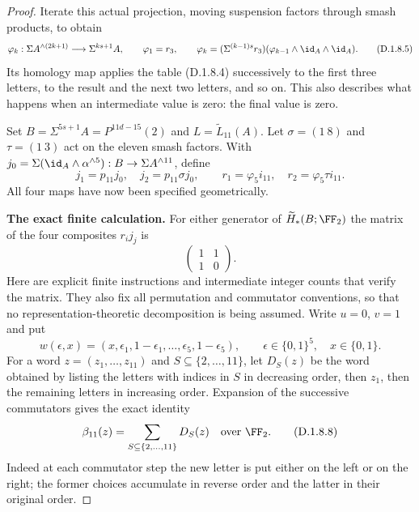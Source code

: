 \begin{proof}
Iterate this actual projection, moving suspension factors through
smash products, to obtain
\[
 \varphi_k:\Sigma A^{\wedge(2k+1)}
                     \longrightarrow\Sigma^{ks+1}A,
 \qquad
 \varphi_1=r_3,\qquad
 \varphi_k=(\Sigma^{(k-1)s}r_3)
                (\varphi_{k-1}\wedge\id_A\wedge\id_A).
 \tag{D.1.8.5}
\]
Its homology map applies the table (D.1.8.4) successively to the
first three letters, to the result and the next two letters, and
so on. This also describes what happens when an intermediate
value is zero: the final value is zero.

Set $B=\Sigma^{5s+1}A=P^{11d-15}(2)$ and
$L=\widetilde L_{11}(A)$. Let $\sigma=(1\ 8)$ and
$\tau=(1\ 3)$ act on the eleven smash factors. With
$j_0=\Sigma(\id_A\wedge\alpha^{\wedge5}):
B\to\Sigma A^{\wedge11}$, define
\[
 j_1=p_{11}j_0,\quad j_2=p_{11}\sigma j_0,
 \qquad
 r_1=\varphi_5i_{11},\quad r_2=\varphi_5\tau i_{11}.
 \tag{D.1.8.6}
\]
All four maps have now been specified geometrically.

\medskip\noindent
\textbf{The exact finite calculation.}
For either generator of $\widetilde H_*(B;\FF_2)$ the matrix
of the four composites $r_i j_j$ is
\[
                     \begin{pmatrix}1&1\\1&0\end{pmatrix}.
 \tag{D.1.8.7}
\]
Here are explicit finite instructions and intermediate integer
counts that verify the matrix. They also fix all permutation and
commutator conventions, so that no representation-theoretic
decomposition is being assumed. Write $u=0$, $v=1$ and put
\[
 w(\epsilon,x)=
 (x,\epsilon_1,1-\epsilon_1,\ldots,
       \epsilon_5,1-\epsilon_5),
 \qquad\epsilon\in\{0,1\}^5,\quad x\in\{0,1\}.
\]
For a word $z=(z_1,\ldots,z_{11})$ and
$S\subseteq\{2,\ldots,11\}$, let $D_S(z)$ be the word obtained
by listing the letters with indices in $S$ in decreasing order,
then $z_1$, then the remaining letters in increasing order.
Expansion of the successive commutators gives the exact identity
\[
               \beta_{11}(z)=\sum_{S\subseteq\{2,\ldots,11\}}
                                  D_S(z)\quad\hbox{over }\FF_2.
 \tag{D.1.8.8}
\]
Indeed at each commutator step the new letter is put either on
the left or on the right; the former choices accumulate in
reverse order and the latter in their original order.


\end{proof}
